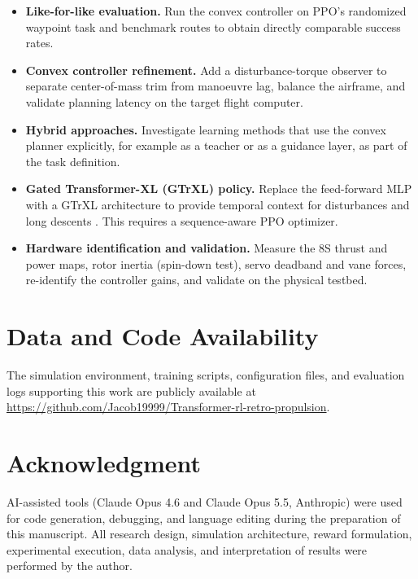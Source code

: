 \documentclass[conference]{IEEEtran}
\begin{document}
\begin{itemize}
    \item \textbf{Like-for-like evaluation.} Run the convex controller on PPO's randomized waypoint task and benchmark routes to obtain directly comparable success rates.
    \item \textbf{Convex controller refinement.} Add a disturbance-torque observer to separate center-of-mass trim from manoeuvre lag, balance the airframe, and validate planning latency on the target flight computer.
    \item \textbf{Hybrid approaches.} Investigate learning methods that use the convex planner explicitly, for example as a teacher or as a guidance layer, as part of the task definition.
    \item \textbf{Gated Transformer-XL (GTrXL) policy.} Replace the feed-forward MLP with a GTrXL architecture \cite{b16, b17} to provide temporal context for disturbances and long descents \cite{b19, b20}. This requires a sequence-aware PPO optimizer.
    \item \textbf{Hardware identification and validation.} Measure the 8S thrust and power maps, rotor inertia (spin-down test), servo deadband and vane forces, re-identify the controller gains, and validate on the physical testbed.
\end{itemize}

\section*{Data and Code Availability}

The simulation environment, training scripts, configuration files, and evaluation logs supporting this work are publicly available at \url{https://github.com/Jacob19999/Transformer-rl-retro-propulsion}.

\section*{Acknowledgment}

AI-assisted tools (Claude Opus 4.6 and Claude Opus 5.5, Anthropic) were used for code generation, debugging, and language editing during the preparation of this manuscript. All research design, simulation architecture, reward formulation, experimental execution, data analysis, and interpretation of results were performed by the author.
\end{document}

